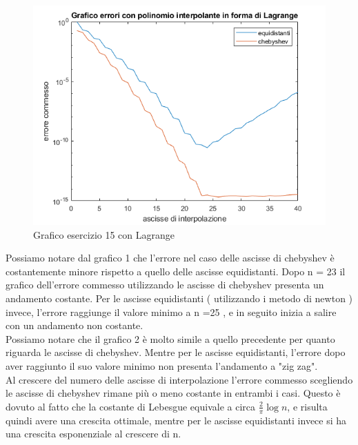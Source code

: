 \begin{figure}[h!]
    \includegraphics[scale=0.8]{CodiceMatlab/Esercizio15-19/graficoEs15Lagrange.png}
    \caption{Grafico esercizio 15 con Lagrange}
    \label{fig:es15}    
\end{figure}
Possiamo notare dal grafico 1  che l'errore nel caso delle ascisse di chebyshev è costantemente minore rispetto a quello delle ascisse equidistanti. Dopo n = 23  il grafico dell'errore commesso utilizzando le ascisse di chebyshev presenta un andamento costante. Per le ascisse equidistanti ( utilizzando i metodo di newton ) invece, l'errore raggiunge il valore minimo a n =25 , e  in seguito inizia a salire con un andamento non costante.\\
Possiamo notare che il grafico 2 è molto simile a quello precedente per quanto riguarda le ascisse di chebyshev. Mentre per le ascisse equidistanti, l'errore dopo aver raggiunto il suo valore minimo non presenta l'andamento a "zig zag".\\
Al crescere del numero delle ascisse di interpolazione l'errore commesso scegliendo le ascisse di chebyshev rimane più o meno costante in entrambi i casi. Questo è dovuto al fatto che la costante di Lebesgue equivale a circa $\frac{2}{\pi}\log{n}$, e risulta quindi avere una crescita ottimale, mentre per le ascisse equidistanti invece si ha una crescita esponenziale al crescere di n.
